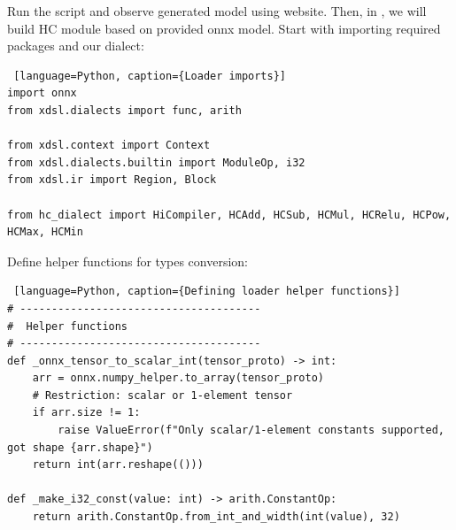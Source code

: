 \documentclass[../main.tex]{subfiles}
\begin{document}
Run the script and observe generated model using  website.
Then, in , we will build HC module based on provided onnx model.
Start with importing required packages and our dialect:
\begin{lstlisting} [language=Python, caption={Loader imports}]
import onnx
from xdsl.dialects import func, arith

from xdsl.context import Context
from xdsl.dialects.builtin import ModuleOp, i32
from xdsl.ir import Region, Block

from hc_dialect import HiCompiler, HCAdd, HCSub, HCMul, HCRelu, HCPow, HCMax, HCMin
\end{lstlisting}
Define helper functions for types conversion:
\begin{lstlisting} [language=Python, caption={Defining loader helper functions}]
# --------------------------------------
#  Helper functions
# --------------------------------------
def _onnx_tensor_to_scalar_int(tensor_proto) -> int:
    arr = onnx.numpy_helper.to_array(tensor_proto)
    # Restriction: scalar or 1-element tensor
    if arr.size != 1:
        raise ValueError(f"Only scalar/1-element constants supported, got shape {arr.shape}")
    return int(arr.reshape(()))

def _make_i32_const(value: int) -> arith.ConstantOp:
    return arith.ConstantOp.from_int_and_width(int(value), 32)
\end{lstlisting}
\end{document}
